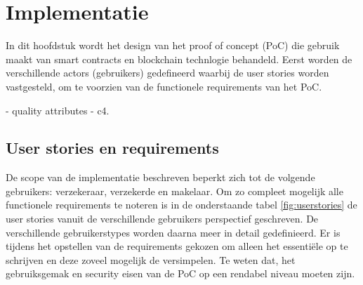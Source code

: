 \chapter{Implementatie}\label{chap:q2}
In dit hoofdstuk wordt het design van het proof of concept (PoC) die gebruik maakt van smart contracts en blockchain technlogie behandeld. Eerst worden de verschillende actors (gebruikers) gedefineerd waarbij de user stories worden vastgesteld, om te voorzien van de functionele requirements van het PoC.
\par

- quality attributes\newline
- c4.
\newpage

\section{User stories en requirements}
De scope van de implementatie beschreven beperkt zich tot de volgende gebruikers:
verzekeraar, verzekerde en makelaar. Om zo compleet mogelijk alle functionele requirements te noteren is in de onderstaande tabel \ref{fig:userstories} de user stories vanuit de verschillende gebruikers perspectief geschreven. De verschillende gebruikerstypes worden daarna meer in detail gedefinieerd. Er is tijdens het opstellen van de requirements gekozen om alleen het essentiële op te schrijven en deze zoveel mogelijk de versimpelen. Te weten dat, het gebruiksgemak en security eisen van de PoC op een rendabel niveau moeten zijn.


